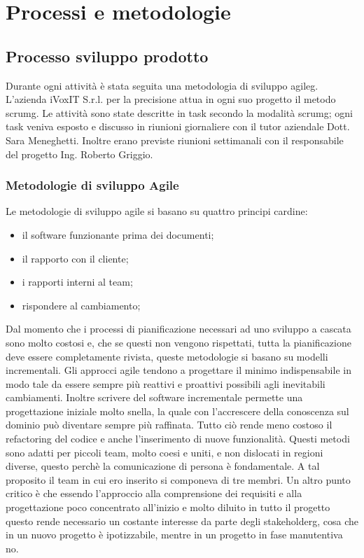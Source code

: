 
\chapter{Processi e metodologie}
\label{cap:processi-metodologie}


\section{Processo sviluppo prodotto}
Durante ogni attività è stata seguita una metodologia di sviluppo \gls{agileg}. L'azienda iVoxIT S.r.l. per la precisione attua in ogni suo progetto il metodo \gls{scrumg}. Le attività sono state descritte in task secondo la modalità \gls{scrumg}; ogni task veniva esposto e discusso in riunioni giornaliere con il tutor aziendale Dott. Sara Meneghetti. Inoltre erano previste riunioni settimanali con il responsabile del progetto Ing. Roberto Griggio.

\subsection{Metodologie di sviluppo Agile}
Le metodologie di sviluppo agile si basano su quattro principi cardine:
\begin{itemize}
    \item il software funzionante prima dei documenti;
    \item il rapporto con il cliente;
    \item i rapporti interni al team;
    \item rispondere al cambiamento;
\end{itemize}

Dal momento che i processi di pianificazione necessari ad uno sviluppo a cascata sono molto costosi e, che se questi non vengono rispettati, tutta la pianificazione deve essere completamente rivista, queste metodologie si basano su modelli incrementali. Gli approcci agile tendono a progettare il minimo indispensabile in modo tale da essere sempre più reattivi e proattivi possibili agli inevitabili cambiamenti. Inoltre scrivere del software incrementale permette una progettazione iniziale molto snella, la quale con l’accrescere della conoscenza sul dominio può diventare sempre più raffinata. Tutto ciò rende meno costoso il refactoring del codice e anche l’inserimento di nuove funzionalità. 
Questi metodi sono adatti per piccoli team, molto coesi e uniti, e non dislocati in regioni diverse, questo perchè la comunicazione di persona è fondamentale. A tal proposito il team in cui ero inserito si componeva di tre membri.
Un altro punto critico è che essendo l’approccio alla comprensione dei requisiti e alla progettazione poco concentrato all’inizio e molto diluito in tutto il progetto questo rende necessario un costante interesse da parte degli \gls{stakeholderg}, cosa che in un nuovo progetto è ipotizzabile, mentre in un progetto in fase manutentiva no.

